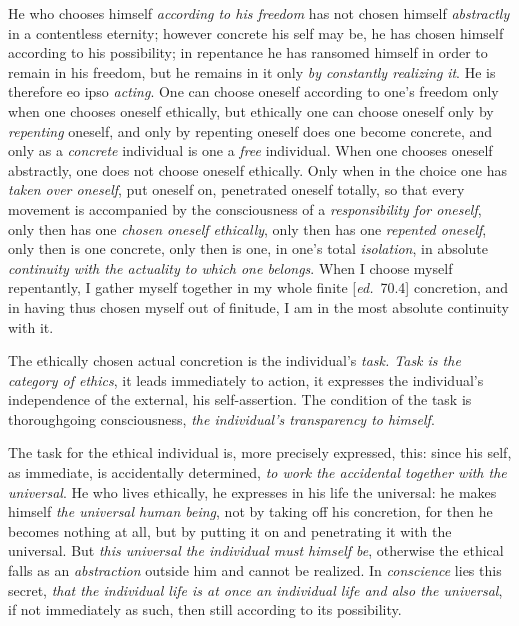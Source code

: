 \documentclass[12pt,a4paper,openany]{book}
\newcommand{\kpage}[1]{\marginnote{\footnotesize\textit{[#1]}}}
\newcommand{\ed}[1]{{\small[\textit{ed.}\ #1]}}
\begin{document}
He who chooses himself \emph{according to his freedom} has not chosen himself \emph{abstractly} in a
contentless eternity; however concrete his self may be, he has chosen
himself according to his possibility; in repentance he has ransomed himself in order to
remain in his freedom, but he remains in it only \emph{by constantly realizing}\kpage{133}
\emph{it}. He is therefore eo ipso \emph{acting}. One can choose oneself
according to one's freedom only when one chooses oneself ethically, but ethically one can
choose oneself only by \emph{repenting} oneself, and only by repenting oneself
does one become concrete, and only as a \emph{concrete} individual is one a \emph{free} individual.
When one chooses oneself abstractly, one does not choose oneself ethically. Only
when in the choice one has \emph{taken over oneself}, put oneself on, penetrated
oneself totally, so that every movement is accompanied by the
consciousness of a \emph{responsibility for oneself}, only then has one \emph{chosen oneself
ethically}, only then has one \emph{repented oneself}, only then is one concrete, only then
is one, in one's total \emph{isolation}, in absolute \emph{continuity with the actuality
to which one belongs}. When I choose myself repentantly, I gather
myself together in my whole finite \ed{70.4} concretion, and in having thus
chosen myself out of finitude, I am in the most absolute continuity
with it.

The ethically chosen actual concretion is the individual's \emph{task. Task
is the category of ethics}, it leads immediately to action, it expresses
the individual's independence of the external, his self-assertion.
The condition of the task is thoroughgoing consciousness, \emph{the individual's
transparency to himself}.

The task for the ethical individual is, more precisely expressed, this: since his
self, as immediate, is accidentally determined, \emph{to work the accidental together
with the universal}. He who lives ethically, he expresses in his life the
universal: he makes himself \emph{the universal human being}, not by taking
off his concretion, for then he becomes nothing at all, but by
putting it on and penetrating it with the universal. But
\emph{this universal the individual must himself be}, otherwise the ethical falls as an \emph{abstraction}
outside him and cannot be realized. In \emph{conscience} lies
this secret, \emph{that the individual life is at once an individual
life and also the universal}, if not immediately as such, then still
according to its possibility.
\end{document}
